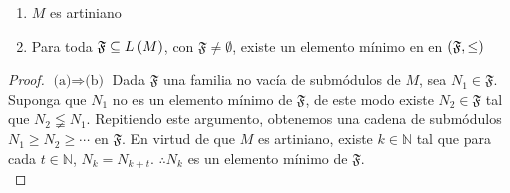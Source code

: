 \documentclass{article}
\begin{document}
\begin{enumerate}[label=\textbf{Ej \arabic*.}]
\begin{enumerate}
	\item $M$ es artiniano
	\item Para toda $\mathfrak{F}\subseteq L\left(M\right)$, con $\mathfrak{F}\neq\emptyset$, existe un elemento mínimo en en $\left(\mathfrak{F},\leq\right)$
\end{enumerate}
\begin{proof}
	$\boxed{\text{(a)}\Rightarrow\text{(b)}}$ Dada $\mathfrak{F}$ una familia no vacía de submódulos de $M$, sea $N_{1}\in\mathfrak{F}$. Suponga que $N_{1}$ no es un elemento mínimo de $\mathfrak{F}$, de este modo existe $N_{2}\in\mathfrak{F}$ tal que $N_{2} \lneqq N_{1}$. Repitiendo este argumento, obtenemos una cadena de submódulos $N_{1} \geq N_{2} \geq \cdots$ en $\mathfrak{F}$. En virtud de que $M$ es artiniano, existe $k\in\mathbb{N}$ tal que para cada $t\in\mathbb{N}$, $N_{k}=N_{k+t}$. $\therefore N_{k}$ es un elemento mínimo de $\mathfrak{F}$.\\
	

\end{proof}
\end{enumerate}
\end{document}
